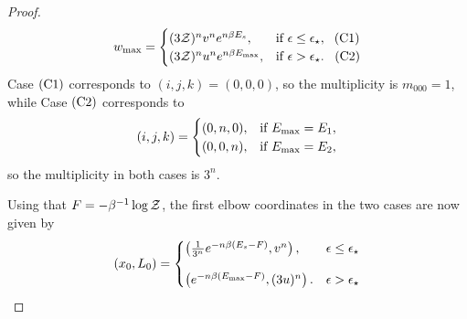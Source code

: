 \documentclass[pra,
aps,
twocolumn,
superscriptaddress,
groupedaddress,
nofootinbib,
reprint
]{revtex4-1}
\begin{document}
\begin{proof}
\begin{equation*}
w_{\rm max} =
	\begin{cases}
		(3\mathcal{Z})^{n} v^n e^{n\beta E_s}, &\mbox{if }\epsilon \leq \epsilon_{\star},\ \hspace{3pt}\rm{(C1)}\\
		(3\mathcal{Z})^{n} u^n e^{n\beta E_{\rm{max}}}, &\mbox{if }\epsilon > \epsilon_{\star}.\ \hspace{5pt}\rm{(C2)} 
	\end{cases}
\end{equation*}
Case $\rm{(C1)}$ corresponds to $(i,j,k) = (0,0,0)$, so the multiplicity is $m_{000} = 1$, while
Case $\rm{(C2)}$ corresponds to
\begin{equation}
	(i,j,k) = 
	\begin{cases}
	(0,n,0), &\text{if } E_{\rm{max}} = E_1, \\
	(0,0,n), &\text{if } E_{\rm{max}} = E_2,
	\end{cases}
\end{equation}
so the multiplicity in both cases is $3^n$.

Using that $F = -\beta^{-1} \log \mathcal{Z}$, the first elbow coordinates in the two cases are now given by
\begin{equation}\label{eq:first_elb_coords}
	(x_0, L_0) =
	\begin{cases}
		\left(\frac{1}{3^n} e^{-n\beta (E_s - F)}, v^n \right), &\epsilon \leq \epsilon_\star \vspace{10pt}\\
		\left( e^{-n\beta (E_{\rm{max}}-F)}, (3u)^n \right). &\epsilon > \epsilon_\star
	\end{cases}
\end{equation}


\end{proof}
\end{document}
